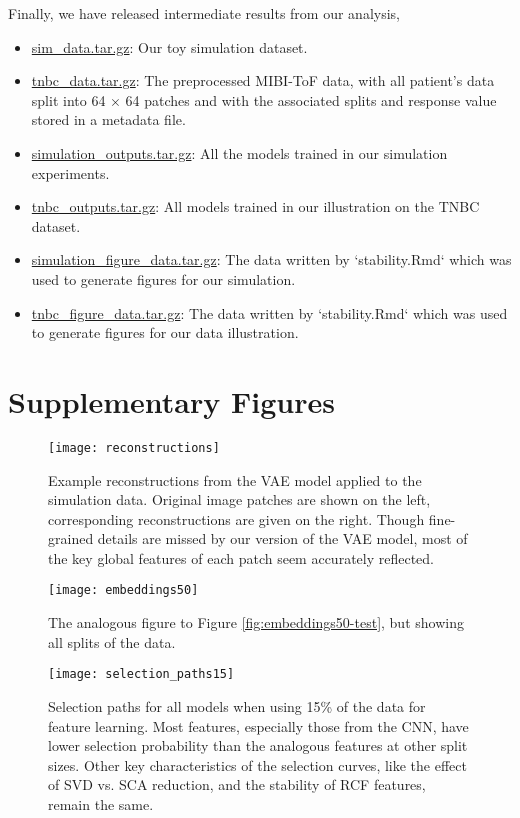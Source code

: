 Finally, we have released intermediate results from our analysis,

\begin{itemize}
\item \href{}{sim\_data.tar.gz}: Our toy simulation dataset.
\item \href{}{tnbc\_data.tar.gz}: The preprocessed MIBI-ToF data, with all
  patient's data split into 64 $\times$ 64 patches and with the associated
  splits and response value stored in a metadata file.
\item \href{}{simulation\_outputs.tar.gz}: All the models trained in our
  simulation experiments.
\item \href{}{tnbc\_outputs.tar.gz}: All models trained in our illustration on
  the TNBC dataset.
\item \href{}{simulation\_figure\_data.tar.gz}: The data written by
  `stability.Rmd` which was used to generate figures for our simulation.
\item \href{}{tnbc\_figure\_data.tar.gz}: The data written by `stability.Rmd`
  which was used to generate figures for our data illustration.
\end{itemize}

\section{Supplementary Figures}

\begin{figure}
\texttt{[image: reconstructions]}
\caption{Example reconstructions from the VAE model applied to the simulation
  data. Original image patches are shown on the left, corresponding
  reconstructions are given on the right. Though fine-grained details are missed
  by our version of the VAE model, most of the key global features of each patch
  seem accurately reflected.}
\label{fig:reconstructions}
\end{figure}

\begin{figure}
  \centering
  \texttt{[image: embeddings50]}
  \caption{The analogous figure to Figure \ref{fig:embeddings50-test}, but
    showing all splits of the data.}
  \label{fig:embeddings50}
\end{figure}

\begin{figure}
  \centering
  \texttt{[image: selection\_paths15]}
  \caption{Selection paths for all models when using 15\% of the data for
    feature learning. Most features, especially those from the CNN, have lower selection
    probability than the analogous features at other split sizes. Other key
    characteristics of the selection curves, like the effect of SVD vs. SCA
    reduction, and the stability of RCF features, remain the same.}
  \label{fig:selection_paths15}
\end{figure}


